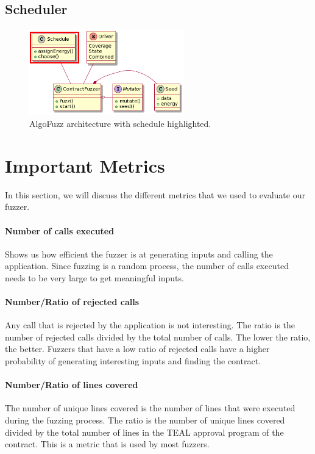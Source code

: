 \subsection*{Scheduler}
\begin{figure}[htbp]
    \centering
    \includegraphics[width=0.6\textwidth]{figures/architecture-schedule-square.png}
    \caption{AlgoFuzz architecture with schedule highlighted.}\label{fig:architecture-schedule}
\end{figure}


\section{Important Metrics}
In this section, we will discuss the different metrics that we used to evaluate our fuzzer.

\paragraph{Number of calls executed} Shows us how efficient the fuzzer is at generating inputs and calling the application.
Since fuzzing is a random process, the number of calls executed needs to be very large to get meaningful inputs.

\paragraph{Number/Ratio of rejected calls} Any call that is rejected by the application is not interesting.
The ratio is the number of rejected calls divided by the total number of calls.
The lower the ratio, the better.
Fuzzers that have a low ratio of rejected calls have a higher probability of generating interesting inputs and finding the contract.

\paragraph{Number/Ratio of lines covered} The number of unique lines covered is the number of lines that were executed during the fuzzing process.
The ratio is the number of unique lines covered divided by the total number of lines in the \ac{TEAL} approval program of the contract.
This is a metric that is used by most fuzzers.

